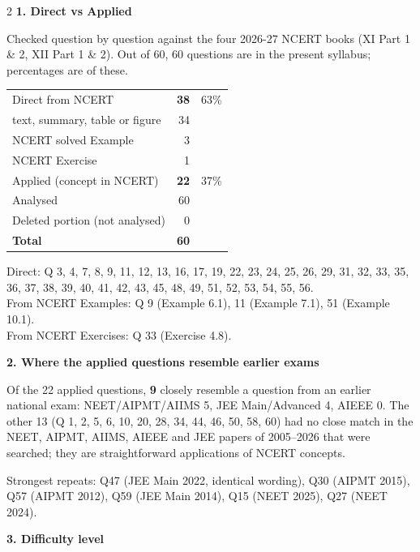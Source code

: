\vspace{4pt}
\begin{multicols}{2}
\textbf{\color{crimson}1. Direct vs Applied}\par\smallskip
{\footnotesize Checked question by question against the four 2026-27 NCERT books (XI Part 1 \& 2, XII Part 1 \& 2). Out of 60, 60 questions are in the present syllabus; percentages are of these.}\par\smallskip
\begin{tabular}{@{}lrr@{}}\toprule
Direct from NCERT & \textbf{38} & 63\%\\
\quad text, summary, table or figure & 34 &\\
\quad NCERT solved Example & 3 &\\
\quad NCERT Exercise & 1 &\\
Applied (concept in NCERT) & \textbf{22} & 37\%\\\midrule
Analysed & 60 &\\
Deleted portion (not analysed) & 0 &\\\midrule
\textbf{Total} & \textbf{60} &\\\bottomrule\end{tabular}\par\smallskip
{\footnotesize Direct: Q 3, 4, 7, 8, 9, 11, 12, 13, 16, 17, 19, 22, 23, 24, 25, 26, 29, 31, 32, 33, 35, 36, 37, 38, 39, 40, 41, 42, 43, 45, 48, 49, 51, 52, 53, 54, 55, 56.\\ From NCERT Examples: Q 9 (Example 6.1), 11 (Example 7.1), 51 (Example 10.1).\\ From NCERT Exercises: Q 33 (Exercise 4.8).}\par\medskip
\textbf{\color{crimson}2. Where the applied questions resemble earlier exams}\par\smallskip
Of the 22 applied questions, \textbf{9} closely resemble a question from an earlier national exam:
NEET/AIPMT/AIIMS 5, JEE Main/Advanced 4, AIEEE 0. The other 13 (Q 1, 2, 5, 6, 10, 20, 28, 34, 44, 46, 50, 58, 60) had no close match in the NEET, AIPMT, AIIMS, AIEEE and JEE papers of 2005--2026 that were searched; they are straightforward applications of NCERT concepts.\par
{\footnotesize Strongest repeats: Q47 (JEE Main 2022, identical wording), Q30 (AIPMT 2015), Q57 (AIPMT 2012), Q59 (JEE Main 2014), Q15 (NEET 2025), Q27 (NEET 2024).}\par\medskip
\textbf{\color{crimson}3. Difficulty level}\par\smallskip
\begin{tabular}{@{}lr@{}}\toprule

\end{tabular}
\end{multicols}
